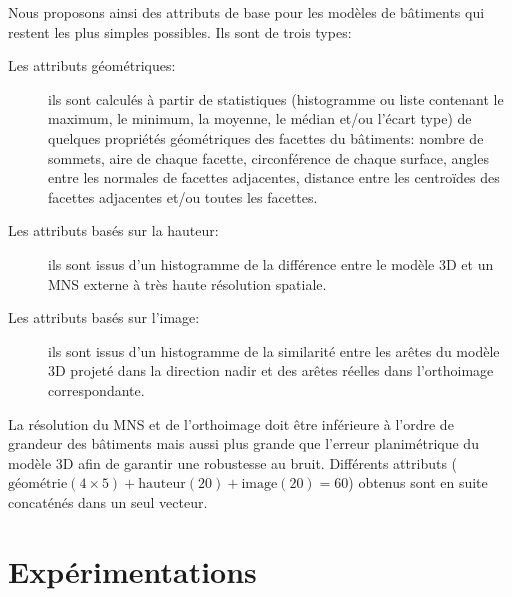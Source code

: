         Nous proposons ainsi des attributs de base pour les modèles de bâtiments qui restent les plus simples possibles.
        Ils sont de trois types:
        \begin{description}
            \item[Les attributs géométriques: ] ils sont calculés à partir de statistiques (histogramme ou liste contenant le maximum, le minimum, la moyenne, le médian et/ou l'écart type) de quelques propriétés géométriques des facettes du bâtiments: nombre de sommets, aire de chaque facette, circonférence de chaque surface, angles entre les normales de facettes adjacentes, distance entre les centroïdes des facettes adjacentes et/ou toutes les facettes.
            \item[Les attributs basés sur la hauteur: ] ils sont issus d'un histogramme de la différence entre le modèle 3D et un MNS externe à très haute résolution spatiale.
            \item[Les attributs basés sur l'image: ] ils sont issus d'un histogramme de la similarité entre les arêtes du modèle 3D projeté dans la direction nadir et des arêtes réelles dans l'orthoimage correspondante.
        \end{description}

        La résolution du MNS et de l'orthoimage doit être inférieure à l'ordre de grandeur des bâtiments mais aussi plus grande que l'erreur planimétrique du modèle 3D afin de garantir une robustesse au bruit.
        Différents attributs (\(\text{géométrie}(4\times5) + \text{hauteur}(20) + \text{image}(20) = 60\)) obtenus sont en suite concaténés dans un seul vecteur.
\section*{Expérimentations}

